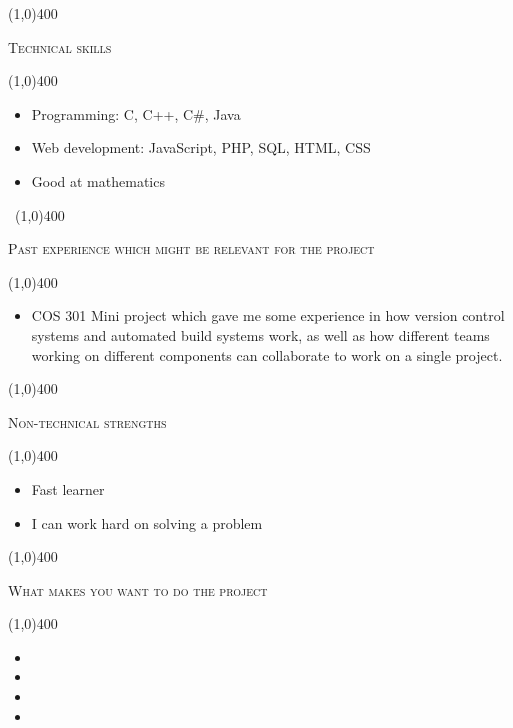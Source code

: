 \documentclass[12pt,a4paper]{report}
\begin{document}
	\begin{center}
	
	\line(1,0){400}\\
	{\scshape\large Technical skills\par}
	\line(1,0){400}\\
	\end{center}
		\begin{itemize}
\item Programming: C, C++, C\#, Java
\item Web development: JavaScript, PHP, SQL, HTML, CSS
\item Good at mathematics
\end{itemize}
\newpage
\begin{center}
	\vspace*{-3cm}\
	\line(1,0){400}\\
	{\scshape\large Past experience which might be relevant for the project\par}
	\line(1,0){400}\\
	\end{center}
		\begin{itemize}
\item COS 301 Mini project which gave me some experience in how version control
systems and automated build systems work, as well as how different teams working
on different components can collaborate to work on a single project.

\end{itemize}

	\begin{center}
	
	\line(1,0){400}\\
	{\scshape\large Non-technical strengths\par}
	\line(1,0){400}\\
	\end{center}
		\begin{itemize}
\item Fast learner
\item I can work hard on solving a problem
\end{itemize}

\begin{center}
	
	\line(1,0){400}\\
	{\scshape\large What makes you want to do the project\par}
	\line(1,0){400}\\
	\end{center}
		\begin{itemize}
\item 
\item 
\item 
\item 
\end{itemize}
\end{document}
